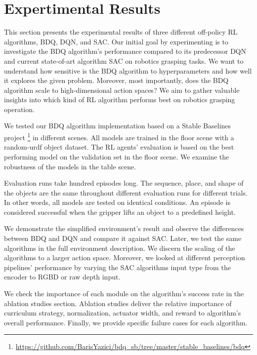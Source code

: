 
\chapter{Expertimental Results}\label{chapter:evaluation}

This section presents the experimental results of three different off-policy RL algorithms, BDQ, DQN, and SAC. Our initial goal by experimenting is to investigate the BDQ algorithm's performance compared to its predecessor DQN and current state-of-art algorithm SAC on robotics grasping tasks. We want to understand how sensitive is the BDQ algorithm to hyperparameters and how well it explores the given problem. Moreover, most importantly, does the BDQ algorithm scale to high-dimensional action spaces? We aim to gather valuable insights into which kind of RL algorithm performs best on robotics grasping operation.

We tested our BDQ algorithm implementation based on a Stable Baselines project \footnote{\url{https://github.com/BarisYazici/bdq_sb/tree/master/stable_baselines/bdq}} in different scenes. All models are trained in the floor scene with a random-urdf object dataset. The RL agents' evaluation is based on the best performing model on the validation set in the floor scene. We examine the robustness of the models in the table scene.

Evaluation runs take hundred episodes long. The sequence, place, and shape of the objects are the same throughout different evaluation runs for different trials. In other words, all models are tested on identical conditions. An episode is considered successful when the gripper lifts an object to a predefined height.

We demonstrate the simplified environment's result and observe the differences between BDQ and DQN and compare it against SAC. Later, we test the same algorithms in the full environment description. We discern the scaling of the algorithms to a larger action space. Moreover, we looked at different perception pipelines' performance by varying the SAC algorithms input type from the encoder to RGBD or raw depth input. 

We check the importance of each module on the algorithm's success rate in the ablation studies section.  Ablation studies deliver the relative importance of curriculum strategy, normalization, actuator width, and reward to algorithm's overall performance. Finally, we provide specific failure cases for each algorithm.



